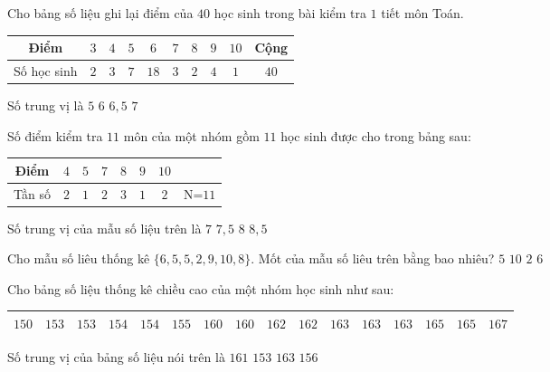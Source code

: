 \begin{ex}%
	Cho bảng số liệu ghi lại điểm của $ 40$ học sinh trong bài kiểm tra $ 1$ tiết môn Toán.
	\begin{center}
		\begin{tabular}{|c|c|c|c|c|c|c|c|c|c|}
			\hline
			Điểm & $ 3$ & $ 4$ & $ 5$ & $ 6$ & $ 7$ & $ 8$ & $ 9$ & $ 10$ & Cộng\\
			\hline
			Số học sinh & $ 2$ & $ 3$ & $ 7$ & $18$ & $ 3$ & $ 2$ & $ 4$ & $ 1$ & $ 40$\\
			\hline
		\end{tabular}
	\end{center}
	Số trung vị là
	\choice
	{$ 5$}
	{\True $ 6$}
	{$ 6{,}5$}
	{$ 7$}
\end{ex}
\begin{ex}%
	Số điểm kiểm tra $11$ môn của một nhóm gồm $11$ học sinh được cho trong bảng sau:
	\begin{center}
		\begin{tabular}{|c|c|c|c|c|c|c|c|}
			\hline
			Điểm & $4$ & $5$ & $7$ & $8$ & $9$ & $10$ &\\
			\hline
			Tần số & $2$ & $1$ & $2$ & $3$ & $1$ & $2$ & N=$11$\\
			\hline
		\end{tabular}
	\end{center}
	Số trung vị của mẫu số liệu trên là
	\choice
	{$7$}
	{\True $7{,}5$}
	{$8$}
	{$8{,}5$}
\end{ex}
\begin{ex}%
	Cho mẫu số liêu thống kê $\{6{,}5{,}5{,}2{,}9{,}10{,}8\}$. Mốt của mẫu số liêu trên bằng bao nhiêu?
	\choice
	{\True $5$}
	{$10$}
	{$2$}
	{$6$}
\end{ex}
\begin{ex}%
	Cho bảng số liệu thống kê chiều cao của một nhóm học sinh như sau:
	\begin{center}
		\begin{tabular}{|l|l|l|l|l|l|l|l|l|l|l|l|l|l|l|l|}
			\hline $150$ & $153$ & $153$ & $154$ & $154$ & $155$ & $160$ & $160$ & $162$ & $162$ & $163$ & $163$ & $163$ & $165$ & $165$ & $167$ \\
			\hline
		\end{tabular}
	\end{center}
	Số trung vị của bảng số liệu nói trên là
	\choice
	{\True $ 161$}
	{$ 153$}
	{$ 163$}
	{$ 156$}
\end{ex}
